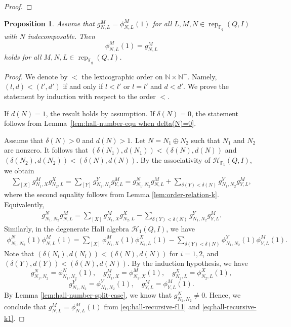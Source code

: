 \documentclass[12pt]{amsart}
\newtheorem{proposition}[theorem]{Proposition}
\theoremstyle{remark}
\theoremstyle{definition}
\numberwithin{equation}{section}
\begin{document}
\begin{proof}
\end{proof}



\begin{proposition}\label{prop:equ when N is ind}
Assume that $g_{N,L}^M=\phi_{N,L}^M(1)$ for all $L,M,N\in \operatorname{rep}_{\mathbb{F}_q}(Q,I)$ with $N$ indecomposable. Then 
\[
\phi^{M}_{N,L}(1)=g^{M}_{N,L}
\]
holds for all $M,N,L\in \operatorname{rep}_{\mathbb{F}_q}(Q,I)$.
\end{proposition}
\begin{proof}
We denote by $<$ the lexicographic order on $\mathbb{N}\times \mathbb{N}^+$. Namely, $(l,d)<(l',d')$ if and only if $l<l'$ or $l=l'$ and $d<d'$. We prove  the statement by induction with respect to the order $<$.

If $d(N)=1$, the result holds by assumption. If $\delta(N)=0$, the statement follows from Lemma~\ref{lem:hall-number-equ when delta(N)=0}.

Assume that $\delta(N)>0$ and $d(N)>1$. Let $N=N_1\oplus N_2$ such that $N_1$ and $N_2$ are nonzero. It follows that $(\delta(N_1),d(N_1))<(\delta(N),d(N))$ and $(\delta(N_2),d(N_2))<(\delta(N),d(N))$. By the associativity of $\mathcal{H}_{\mathbb{F}_1}(Q,I)$, we obtain
\begin{align*}
    \sum_{[X]}g_{N_1,X}^Mg_{N_2,L}^X=\sum_{[Y]}g_{N_1,N_2}^Yg_{Y,L}^M=g_{N_1,N_2}^Ng_{N,L}^M+\sum_{\delta(Y)<\delta(N)}g_{N_1,N_2}^Yg_{Y,L}^M,
\end{align*}
where the second equality follows from Lemma \ref{lem:order-relation-k}. Equivalently,
\begin{align}\label{eq:hall-recursive-f11}
    g_{N_1,N_2}^Ng_{N,L}^M=\sum_{[X]}g_{N_1,X}^Mg_{N_2,L}^X-\sum_{\delta(Y)<\delta(N)}g_{N_1,N_2}^Yg_{Y,L}^M.
\end{align}
Similarly, in the degenerate Hall algebra $\mathcal{H}_1(Q,I)$, we have
\begin{align}\label{eq:hall-recursive-k1}
    \phi_{N_1,N_2}^N(1)\phi_{N,L}^M(1)=\sum_{[X]}\phi_{N_1,X}^M(1)\phi_{N_2,L}^X(1)-\sum_{\delta(Y)<\delta(N)}\phi_{N_1,N_2}^Y(1)\phi_{Y,L}^M(1).
\end{align}
Note that $(\delta(N_i),d(N_i))<(\delta(N),d(N))$ for $i=1,2$, and $(\delta(Y),d(Y))<(\delta(N),d(N))$. By the induction hypothesis, we have \[
g_{N_1,N_2}^N=\phi_{N_1,N_2}^N(1),\quad g_{N_1,X}^M=\phi_{N_1,X}^M(1),\quad g_{N_2,L}^X=\phi_{N_2,L}^X(1),\]
\[g_{N_1,N_2}^Y=\phi_{N_1,N_2}^Y(1),\quad g_{Y,L}^M=\phi_{Y,L}^M(1).
\]
By Lemma \ref{lem:hall-number-split-case}, we know that $g_{N_1,N_2}^N\neq 0$. Hence, we conclude that $g_{N,L}^M=\phi_{N,L}^M(1)$ from \eqref{eq:hall-recursive-f11} and \eqref{eq:hall-recursive-k1}.


\end{proof}
\end{document}
